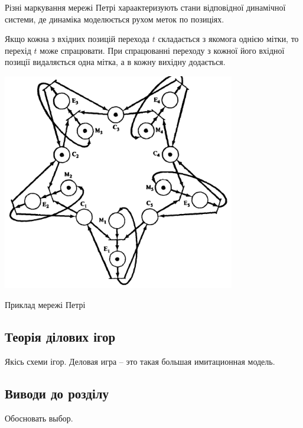 Різні маркування мережі Петрі хараактеризують стани відповідної динамічної системи, де динаміка моделюється рухом меток по позиціях.

Якщо кожна з вхідних позицій перехода $t$ складається з якомога однією мітки, то перехід $t$ може спрацювати. При спрацюванні переходу з кожної його вхідної позиції видаляється одна мітка, а в кожну вихідну додається.

            \begin{stdfigure}
                \includegraphics[width=4in]{images/petri_net_example.png}
                \caption{Приклад мережі Петрі}
                \label{fig:petri_net_example}
            \end{stdfigure}   


\subsection{Теорія ділових ігор}
	Якісь схеми ігор. Деловая игра -- это такая большая имитационная модель.



\subsection{Виводи до розділу}
Обосновать выбор.
